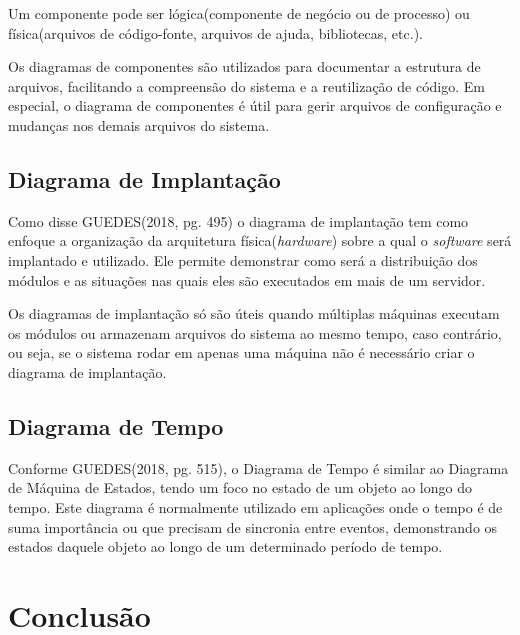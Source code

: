 \documentclass[12pt,openright,oneside,a4paper,
	chapter=TITLE,
	section=TITLE,
	english,brazil]{abntex2}
\begin{document}
Um componente pode ser lógica(componente de negócio ou de processo) ou física(arquivos de código-fonte, arquivos de ajuda, bibliotecas, etc.).

Os diagramas de componentes são utilizados para documentar a estrutura de arquivos, facilitando a compreensão do sistema e a reutilização de código. Em especial, o diagrama de componentes é útil para gerir arquivos de configuração e mudanças nos demais arquivos do sistema.

\section{Diagrama de Implantação}

Como disse GUEDES(2018, pg. 495) o diagrama de implantação tem como enfoque a organização da arquitetura física(\textit{hardware}) sobre a qual o \textit{software} será implantado e utilizado. Ele permite demonstrar como será a distribuição dos módulos e as situações nas quais eles são executados em mais de um servidor.

Os diagramas de implantação só são úteis quando múltiplas máquinas executam os módulos ou armazenam arquivos do sistema ao mesmo tempo, caso contrário, ou seja, se o sistema rodar em apenas uma máquina não é necessário criar o diagrama de implantação.

\section{Diagrama de Tempo}

Conforme GUEDES(2018, pg. 515), o Diagrama de Tempo é similar ao Diagrama de Máquina de Estados, tendo um foco no estado de um objeto ao longo do tempo. Este diagrama é normalmente utilizado em aplicações onde o tempo é de suma importância ou que precisam de sincronia entre eventos, demonstrando os estados daquele objeto ao longo de um determinado período de tempo.

\chapter{Conclusão}

\postextual


\nocite{GUEDES}
\nocite{BEZERRA}
\nocite{LARMAN}
\nocite{UML}
\end{document}
